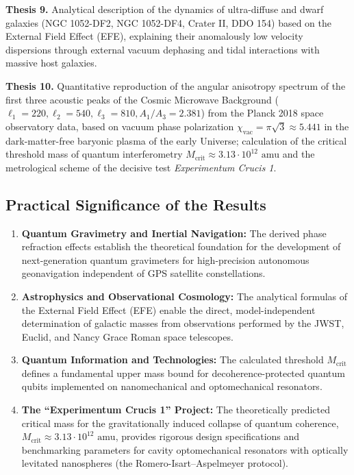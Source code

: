 \documentclass[11pt,a4paper]{article}
\theoremstyle{definition}
\begin{document}
\textbf{Thesis 9.} Analytical description of the dynamics of ultra-diffuse and dwarf galaxies (NGC 1052-DF2, NGC 1052-DF4, Crater II, DDO 154) based on the External Field Effect (EFE), explaining their anomalously low velocity dispersions through external vacuum dephasing and tidal interactions with massive host galaxies.

\textbf{Thesis 10.} Quantitative reproduction of the angular anisotropy spectrum of the first three acoustic peaks of the Cosmic Microwave Background ($\ell_1=220, \ell_2=540, \ell_3=810, A_1/A_3=2.381$) from the Planck 2018 space observatory data, based on vacuum phase polarization $\chi_{\text{vac}} = \pi\sqrt{3} \approx 5.441$ in the dark-matter-free baryonic plasma of the early Universe; calculation of the critical threshold mass of quantum interferometry $M_{\text{crit}} \approx 3.13 \cdot 10^{12}\text{ amu}$ and the metrological scheme of the decisive test \textit{Experimentum Crucis 1}.

\subsection{Practical Significance of the Results}\label{subsec:significance}

\begin{enumerate}
\item \textbf{Quantum Gravimetry and Inertial Navigation:} The derived phase refraction effects establish the theoretical foundation for the development of next-generation quantum gravimeters for high-precision autonomous geonavigation independent of GPS satellite constellations.
\item \textbf{Astrophysics and Observational Cosmology:} The analytical formulas of the External Field Effect (EFE) enable the direct, model-independent determination of galactic masses from observations performed by the JWST, Euclid, and Nancy Grace Roman space telescopes.
\item \textbf{Quantum Information and Technologies:} The calculated threshold $M_{\text{crit}}$ defines a fundamental upper mass bound for decoherence-protected quantum qubits implemented on nanomechanical and optomechanical resonators.
\item \textbf{The ``Experimentum Crucis 1'' Project:} The theoretically predicted critical mass for the gravitationally induced collapse of quantum coherence, $M_{\text{crit}} \approx 3.13 \cdot 10^{12}\text{ amu}$, provides rigorous design specifications and benchmarking parameters for cavity optomechanical resonators with optically levitated nanospheres (the Romero-Isart--Aspelmeyer protocol).
\end{enumerate}

\clearpage
\end{document}
